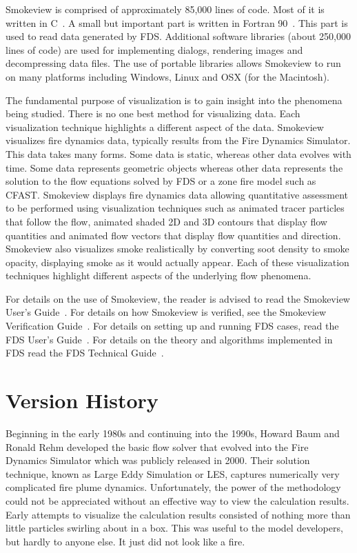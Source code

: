 \documentclass[11pt,twoside]{book}
\begin{document}
Smokeview is comprised of approximately 85,000 lines of code.  Most of it is written in C~\cite{C:book}.
A small but important part is written in Fortran 90~\cite{Fortran:book}.  This part is used to read data
generated by FDS.  Additional software libraries (about 250,000 lines of code) are used for implementing dialogs, rendering images and decompressing data files.
The use of portable libraries allows Smokeview
to run on many platforms including Windows, Linux and OSX (for the
Macintosh).

The fundamental purpose of visualization is to gain
insight into the phenomena being studied.
There is no one best method for visualizing data.
Each visualization technique highlights a different aspect of the data.
Smokeview visualizes fire dynamics data, typically results from the Fire Dynamics Simulator.
This data takes many forms.  Some data is static, whereas other data evolves with time.
Some data represents geometric objects whereas other data represents the solution to the flow equations solved by FDS or a zone fire model such as CFAST.
Smokeview displays fire dynamics data allowing quantitative assessment to be performed using
visualization techniques such as animated tracer
particles that follow the flow, animated shaded 2D and 3D contours
that display flow quantities and animated flow vectors that
display flow quantities and direction. Smokeview also visualizes
smoke realistically by converting soot density to smoke opacity,
displaying smoke as it would actually appear.
Each of these visualization
techniques highlight different aspects of the underlying flow
phenomena.

For details on the use of Smokeview, the reader is advised to read the Smokeview User's
Guide~\cite{Smokeview_Users_Guide_5}. For details on how Smokeview is verified,
see the Smokeview Verification Guide~\cite{Smokeview_Verification_Guide_5}.  For details on setting up and
running FDS cases, read the FDS User's
Guide~\cite{FDS_Users_Guide_5}.  For details on the theory and algorithms implemented in FDS
read the FDS Technical Guide~\cite{FDS_Tech_Guide_5}.

\section{Version History}

Beginning in the early 1980s and continuing into the 1990s, Howard Baum and Ronald Rehm developed the basic flow solver that evolved into the Fire Dynamics Simulator which was publicly released in 2000\cite{McGrattan:6}.  Their solution technique, known as Large Eddy Simulation or LES, captures numerically very complicated fire plume dynamics.  Unfortunately, the power of the methodology could not be appreciated without an effective way to view the calculation results.  Early attempts to visualize the calculation results consisted of nothing more than little particles swirling about in a box.  This was useful to the model developers, but hardly to anyone else.  It just did not look like a fire.
\end{document}
